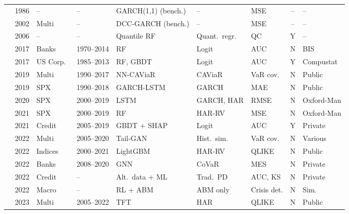 \begin{longtable}{@{}p{2.4cm} c p{1.0cm} p{1.0cm} p{2.0cm} p{1.9cm} p{1.4cm} c p{1.4cm}@{}}
\citet{Bollerslev1986} & 1986 & --     & --         & GARCH(1,1) (bench.) & --              & MSE          & -- & --     \\
\citet{Engle2002}      & 2002 & Multi  & --         & DCC-GARCH (bench.)  & --              & MSE          & -- & --     \\
\citet{Meinshausen2006}& 2006 & --     & --         & Quantile RF       & Quant.\ regr.    & QC           & Y & --     \\
\citet{Holopainen2017} & 2017 & Banks  & 1970--2014 & RF                & Logit            & AUC          & N & BIS    \\
\citet{Barboza2017}    & 2017 & US Corp.\ & 1985--2013 & RF, GBDT       & Logit            & AUC          & Y & Compustat \\
\citet{Taylor2019}     & 2019 & Multi  & 1990--2017 & NN-CAViaR         & CAViaR           & VaR cov.\    & N & Public \\
\citet{Zhang2019}      & 2019 & SPX    & 1990--2018 & GARCH-LSTM        & GARCH            & MAE          & N & Public \\
\citet{Bucci2020}      & 2020 & SPX    & 2000--2019 & LSTM              & GARCH, HAR       & RMSE         & N & Oxford-Man \\
\citet{Luong2021}      & 2021 & SPX    & 2000--2019 & RF                & HAR-RV           & MSE          & N & Oxford-Man \\
\citet{Bussmann2021}   & 2021 & Credit & 2005--2019 & GBDT + SHAP       & Logit            & AUC          & Y & Private \\
\citet{Cont2022}       & 2022 & Multi  & 2005--2020 & Tail-GAN          & Hist.\ sim.\     & VaR cov.\    & N & Various \\
\citet{Mittnik2022}    & 2022 & Indices& 2000--2021 & LightGBM          & HAR-RV           & QLIKE        & N & Public \\
\citet{Giudici2022}    & 2022 & Banks  & 2008--2020 & GNN               & CoVaR            & MES          & N & Private \\
\citet{Suss2022}       & 2022 & Credit & --         & Alt.\ data + ML   & Trad.\ PD        & AUC, KS      & N & Private \\
\citet{Delli2022}      & 2022 & Macro  & --         & RL + ABM          & ABM only         & Crisis det.  & N & Sim.   \\
\citet{Christensen2023}& 2023 & Multi  & 2005--2022 & TFT               & HAR              & QLIKE        & N & Public \\

\end{longtable}

